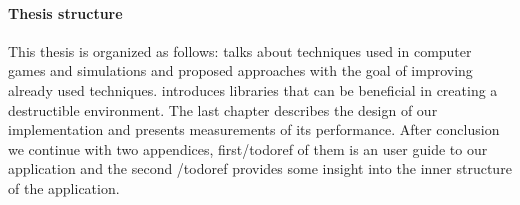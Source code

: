 


\paragraph{Thesis structure}
This thesis is organized as follows:  talks about techniques used in computer games and simulations and proposed approaches with the goal of improving already used techniques.  introduces libraries that can be beneficial in creating a destructible environment. The last chapter describes the design of our implementation and presents measurements of its performance. After conclusion we continue with two appendices, first/todo{ref} of them is an user guide to our application and the second /todo{ref} provides some insight into the inner structure of the application. 

